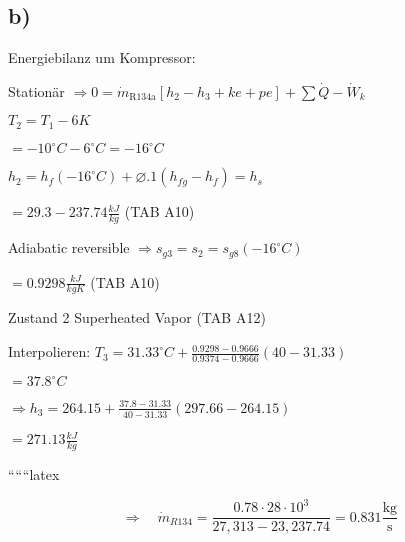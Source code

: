 

\subsection*{b)}

Energiebilanz um Kompressor:

Stationär $\Rightarrow 0 = \dot{m}_{\text{R134a}} \left[ h_2 - h_3 + ke + pe \right] + \sum \dot{Q} - \dot{W}_k$

$T_2 = T_1 - 6K$

$= -10^\circ C - 6^\circ C = -16^\circ C$

$h_2 = h_f (-16^\circ C) + \varnothing .1 (h_{fg} - h_f) = h_s$

$= 29.3 - 237.74 \frac{kJ}{kg}$ \hspace{1cm} (TAB A10)

Adiabatic reversible $\Rightarrow s_{g3} = s_2 = s_{g8} (-16^\circ C)$

$= 0.9298 \frac{kJ}{kg K}$ \hspace{1cm} (TAB A10)

Zustand 2 Superheated Vapor \hspace{1cm} (TAB A12)

Interpolieren: $T_3 = 31.33^\circ C + \frac{0.9298 - 0.9666}{0.9374 - 0.9666} (40 - 31.33)$

$= 37.8^\circ C$

$\Rightarrow h_3 = 264.15 + \frac{37.8 - 31.33}{40 - 31.33} (297.66 - 264.15)$

$= 271.13 \frac{kJ}{kg}$

``````latex


\[
\Rightarrow \quad \dot{m}_{R134} = \frac{0.78 \cdot 28 \cdot 10^3}{27,313 - 23,237.74} = 0.831 \frac{\text{kg}}{\text{s}}
\]